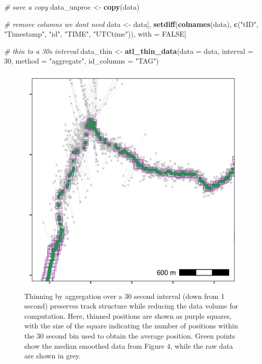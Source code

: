 \documentclass[
]{scrartcl}
\newenvironment{Shaded}{}{}
\newcommand{\CommentTok}[1]{\textcolor[rgb]{0.38,0.63,0.69}{\textit{#1}}}
\newcommand{\DataTypeTok}[1]{\textcolor[rgb]{0.56,0.13,0.00}{#1}}
\newcommand{\DecValTok}[1]{\textcolor[rgb]{0.25,0.63,0.44}{#1}}
\newcommand{\KeywordTok}[1]{\textcolor[rgb]{0.00,0.44,0.13}{\textbf{#1}}}
\newcommand{\NormalTok}[1]{#1}
\newcommand{\OtherTok}[1]{\textcolor[rgb]{0.00,0.44,0.13}{#1}}
\newcommand{\StringTok}[1]{\textcolor[rgb]{0.25,0.44,0.63}{#1}}
\begin{document}
\begin{Shaded}
\begin{Highlighting}[]
\CommentTok{\# save a copy}
\NormalTok{data\_unproc <{-}}\StringTok{ }\KeywordTok{copy}\NormalTok{(data)}

\CommentTok{\# remove columns we don\textquotesingle{}t need}
\NormalTok{data <{-}}\StringTok{ }\NormalTok{data[, }\KeywordTok{setdiff}\NormalTok{(}\KeywordTok{colnames}\NormalTok{(data), }
                       \KeywordTok{c}\NormalTok{(}\StringTok{"tID"}\NormalTok{, }\StringTok{"Timestamp"}\NormalTok{, }\StringTok{"id"}\NormalTok{, }\StringTok{"TIME"}\NormalTok{, }\StringTok{"UTCtime"}\NormalTok{)), }
\NormalTok{             with =}\StringTok{ }\OtherTok{FALSE}\NormalTok{]}

\CommentTok{\# thin to a 30s interval}
\NormalTok{data\_thin <{-}}\StringTok{ }\KeywordTok{atl\_thin\_data}\NormalTok{(}\DataTypeTok{data =}\NormalTok{ data,}
                           \DataTypeTok{interval =} \DecValTok{30}\NormalTok{,}
                           \DataTypeTok{method =} \StringTok{"aggregate"}\NormalTok{,}
                           \DataTypeTok{id\_columns =} \StringTok{"TAG"}\NormalTok{)}
\end{Highlighting}
\end{Shaded}

\begin{figure}
\centering
\includegraphics{figures/fig_calib_smooth_thin.png}
\caption{Thinning by aggregation over a 30 second interval (down from 1 second) preserves track structure while reducing the data volume for computation. Here, thinned positions are shown as purple squares, with the size of the square indicating the number of positions within the 30 second bin used to obtain the average position. Green points show the median smoothed data from Figure 4, while the raw data are shown in grey.}
\end{figure}
\end{document}
